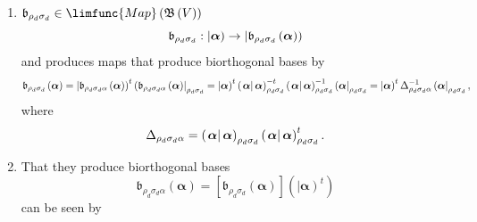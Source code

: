 \documentclass[aps,preprint]{revtex4}
\begin{document}
\begin{enumerate}
\begin{enumerate}
\item $\mathfrak{b}_{\rho _{d}\sigma _{d}}\in \limfunc{Map}\left( \mathfrak{B%
}\left( V\right) \right) $ 
\begin{equation}
\mathfrak{b}_{\rho _{d}\sigma _{d}}:\left\vert \boldsymbol{\alpha }\right)
\rightarrow \left\vert \mathfrak{b}_{\rho _{d}\sigma _{d}}\left( \boldsymbol{%
\alpha }\right) \right)
\end{equation}%
and produces maps that produce biorthogonal bases by 
\begin{equation}
\mathfrak{b}_{\rho _{d}\sigma _{d}}\left( \boldsymbol{\alpha }\right)
=\left\vert \mathfrak{b}_{\rho _{d}\sigma _{d}\alpha }\left( \boldsymbol{%
\alpha }\right) \right) ^{t}\left( \mathfrak{b}_{\rho _{d}\sigma _{d}\alpha
}\left( \boldsymbol{\alpha }\right) \right\vert _{\rho _{d}\sigma
_{d}}=\left\vert \boldsymbol{\alpha }\right) ^{t}\left( \left. \boldsymbol{%
\alpha }\right\vert \boldsymbol{\alpha }\right) _{\rho _{d}\sigma
_{d}}^{-t}\left( \left. \boldsymbol{\alpha }\right\vert \boldsymbol{\alpha }%
\right) _{\rho _{d}\sigma _{d}}^{-1}\left( \boldsymbol{\alpha }\right\vert
_{\rho _{d}\sigma _{d}}=\left\vert \boldsymbol{\alpha }\right) ^{t}{\Large %
\Delta }_{\rho _{d}\sigma _{d}\alpha }^{-1}\left( \boldsymbol{\alpha }%
\right\vert _{\rho _{d}\sigma _{d}},
\end{equation}%
where 
\begin{equation}
{\Large \Delta }_{\rho _{d}\sigma _{d}\alpha }=\left( \left. \boldsymbol{%
\alpha }\right\vert \boldsymbol{\alpha }\right) _{\rho _{d}\sigma
_{d}}\left( \left. \boldsymbol{\alpha }\right\vert \boldsymbol{\alpha }%
\right) _{\rho _{d}\sigma _{d}}^{t}.
\end{equation}

\item That they produce biorthogonal bases 
\begin{equation}
\mathfrak{b}_{\rho _{d}\sigma _{d}\alpha }\left( \boldsymbol{\alpha }\right)
=\left[ \mathfrak{b}_{\rho _{d}\sigma _{d}}\left( \boldsymbol{\alpha }%
\right) \right] \left( \left\vert \boldsymbol{\alpha }\right) ^{t}\right)
\end{equation}%
can be seen by


\end{enumerate}
\end{enumerate}
\end{document}
